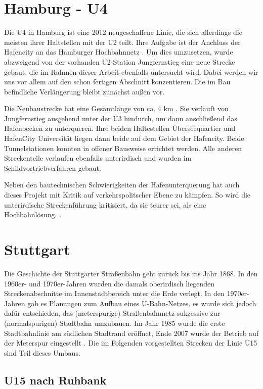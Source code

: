 \section[Hamburg]{Hamburg - U4}

Die U4 in Hamburg ist eine 2012 neugeschaffene Linie, die sich allerdings die
meisten ihrer Haltstellen mit der U2 teilt. Ihre Aufgabe ist der Anchluss der
Hafencity an das Hamburger Hochbahnnetz \cite{keuHH}. Um dies umzusetzen, wurde
abzweigend von der vorhanden U2-Station Jungfernstieg eine neue Strecke gebaut,
die im Rahmen dieser Arbeit ebenfalls untersucht wird. Dabei werden wir uns vor
allem auf den schon fertigen Abschnitt konzentieren. Die im Bau befindliche
Verlängerung bleibt zunächst außen vor.

Die Neubaustrecke hat eine Gesamtlänge von ca. 4 km \cite{keuHH}. Sie verläuft
von Jungfernstieg ausgehend unter der U3 hindurch, um dann anschließend das
Hafenbecken zu unterqueren. Ihre beiden Haltestellen Überseequartier und
HafenCity Universität liegen dann beide auf dem Gebiet der Hafencity. Beide
Tunnelstationen konnten in offener Bausweise errichtet werden. Alle anderen
Streckenteile verlaufen ebenfalls unterirdisch und wurden im
Schildvortriebverfahren gebaut.

Neben den bautechnischen Schwierigkeiten der Hafenunterquerung hat auch dieses
Projekt mit Kritik auf verkehrspolitscher Ebene zu kämpfen. So wird die
unterirdische Streckenführung kritisiert, da sie teurer sei, als eine
Hochbahnlösung. \cite{hamburgerAbendblattu4}.

\section{Stuttgart}

Die Geschichte der Stuttgarter Straßenbahn geht zurück bis ins Jahr 1868. In den
1960er- und 1970er-Jahren wurden die damals oberirdisch liegenden
Streckenabschnitte im Innenstadtbereich unter die Erde verlegt.  In den
1970er-Jahren gab es Planungen zum Aufbau eines U-Bahn-Netzes, es wurde sich
jedoch dafür entschieden, das (meterspurige) Straßenbahnnetz sukzessive zur
(normalspurigen) Stadtbahn umzubauen. Im Jahr 1985 wurde die erste
Stadtbahnlinie am südlichen Stadtrand eröffnet, Ende 2007 wurde der Betrieb auf
der Meterspur eingestellt \cite{SSBgeschichte}. Die im Folgenden vorgestellten
Strecken der Linie U15 sind Teil dieses Umbaus.

\subsection*{U15 nach Ruhbank}

